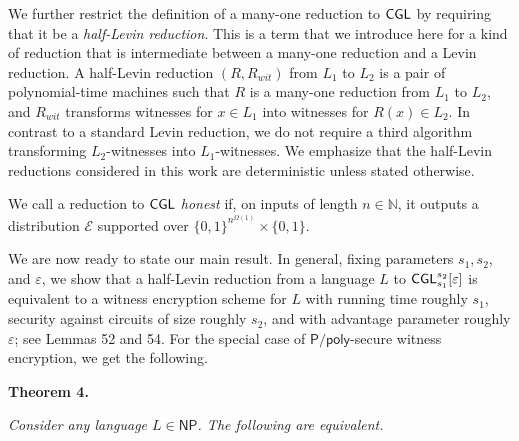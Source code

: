 \documentclass[10pt,a4paper]{article}
\begin{document}
We further restrict the definition of a many-one reduction to ${\sf CGL}$ by requiring that it be a \emph{half-Levin reduction}. This is a term that we introduce here for a kind of reduction that is intermediate between a many-one reduction and a Levin reduction. A half-Levin reduction $(R,R_{wit})$ from $L_{1}$ to $L_{2}$ is a pair of polynomial-time machines such that $R$ is a many-one reduction from $L_{1}$ to $L_{2}$, and $R_{wit}$ transforms witnesses for $x\in L_{1}$ into witnesses for $R(x)\in L_{2}$. In contrast to a standard Levin reduction, we do not require a third algorithm transforming $L_{2}$-witnesses into $L_{1}$-witnesses. We emphasize that the half-Levin reductions considered in this work are deterministic unless stated otherwise.\par




We call a reduction to ${\sf CGL}$ \emph{honest} if, on inputs of length $n\in\mathbb{N}$, it outputs a distribution $\mathcal{E}$ supported over $\{0,1\}^{n^{\Omega(1)}}\times\{0,1\}$.\par




We are now ready to state our main result. In general, fixing parameters $s_{1},s_{2}$, and $\varepsilon$, we show that a half-Levin reduction from a language $L$ to ${\sf CGL}_{s_{1}}^{s_{2}}[\varepsilon]$ is equivalent to a witness encryption scheme for $L$ with running time roughly $s_{1}$, security against circuits of size roughly $s_{2}$, and with advantage parameter roughly $\varepsilon$; see Lemmas 52 and 54. For the special case of ${\mathsf{P}}/{\mathsf{poly}}$-secure witness encryption, we get the following.\par






\par\medskip\noindent\textbf{
\textbf{Theorem 4}\textbf{.}
}\par



\emph{Consider any language $L\in{\mathsf{NP}}$. The following are equivalent.}\par
\end{document}
